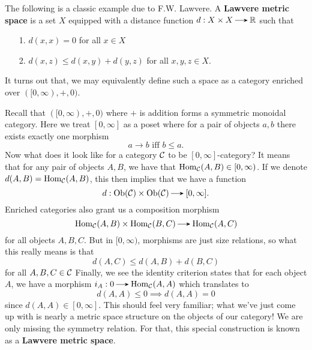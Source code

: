 \begin{example}
    The following is a classic example due to F.W. Lawvere.
    A \textbf{Lawvere metric space} is a set $X$ 
    equipped with a distance function $d: X\times X \to \rr$ such that 
    \begin{itemize}
        \item[1.] $d(x, x) = 0$ for all $x \in X$
        \item[2.] $d(x, z) \le d(x, y) + d(y, z)$ for all $x, y, z \in X$.  
    \end{itemize}
    It turns out that, we may equivalently define such a space as a category enriched 
    over $([0, \infty), +, 0)$.

    Recall that $([0, \infty), +, 0)$ where $+$ is addition forms a symmetric monoidal 
    category. Here we treat $[0, \infty]$ as a poset where for a pair of objects $a, b$ 
    there exists exactly one morphism 
    \[
        a \to b \text{ iff } b \le a.   
    \] 
    Now what does it look like for a category $\mathcal{C}$ to be $[0, \infty]$-category? 
    It means that for any pair of objects $A, B$, we have that $\operatorname{\mathrm{Hom}}_{\mathcal{C}}(A, B) \in [0, \infty)$.
    If we denote $d(A, B) = \operatorname{\mathrm{Hom}}_{\mathcal{C}}(A, B)$,
    this then implies that we have a function 
    \[
        d: \ob(\cc)\times\ob(\cc) \to [0, \infty].
    \]
    Enriched categories also grant us a composition morphism
    \[ 
        \hom_{\cc}(A, B) \times \hom_{\cc}(B, C) \to \hom_{\cc}(A, C)
    \]
    for all objects $A, B, C$. But in $[0, \infty)$, morphisms are just size relations,
    so what this really means is that
    \[
        d(A,C) \le d(A, B) + d(B, C)
    \]
    for all $A, B, C \in \mathcal{C}$
    Finally, we see the identity criterion states that for each object $A$, 
    we have a morphism $i_{A}: 0 \to \hom_{\cc}(A, A)$ which translates to
    \[
        d(A, A) \le 0 \implies d(A, A) = 0
    \]
    since $d(A, A) \in [0, \infty]$. This should feel very familiar; what we've just 
    come up with is nearly a metric space structure on the objects of our category! 
    We are only missing the symmetry relation. For that, this special construction is known 
    as a \textbf{Lawvere metric space}. 
\end{example}

